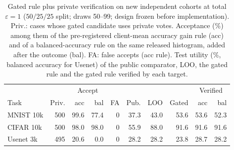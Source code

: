 \begin{table}[t]
\caption{Gated rule plus private verification on new independent cohorts at total $\varepsilon=1$ ($50/25/25$ split; draws 50--99; design frozen before implementation). Priv.: cases whose gated candidate uses private votes. Acceptance (\%) among them of the pre-registered client-mean accuracy gain rule (acc) and of a balanced-accuracy rule on the same released histogram, added after the outcome (bal). FA: false accepts (acc rule). Test utility (\%, balanced accuracy for Usenet) of the public comparator, LOO, the gated rule and the gated rule verified by each target.}
\label{tab:verify-teacher}\small\setlength{\tabcolsep}{2.2pt}
\centering
\begin{tabular}{@{}lrrrrrrrrr@{}}\toprule
 & & \multicolumn{2}{c}{Accept} & & & & & \multicolumn{2}{c}{Verified} \\
Task & Priv. & acc & bal & FA & Pub. & LOO & Gated & acc & bal \\
\midrule
MNIST 10k & 500 & 99.6 & 77.4 & 0 & 37.3 & 43.0 & 53.6 & 53.6 & 52.3 \\
CIFAR 10k & 500 & 98.0 & 98.0 & 0 & 55.9 & 88.0 & 91.6 & 91.6 & 91.6 \\
Usenet 3k & 495 & 20.6 & 0.0 & 0 & 28.2 & 28.2 & 23.8 & 28.7 & 28.2 \\
\bottomrule\end{tabular}
\end{table}
